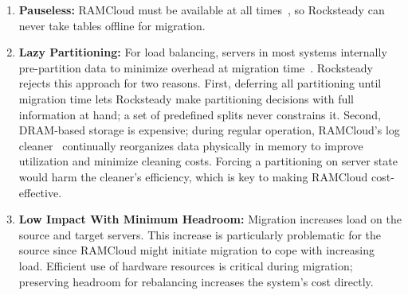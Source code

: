 \begin{enumerate}
\item {\bf Pauseless:}
RAMCloud must be available at all times~\cite{ramcloud-recovery}, so
Rocksteady can never take tables offline for migration.

\item {\bf Lazy Partitioning:}
For load balancing, servers in most systems
internally pre-partition data
to minimize overhead at migration time~\cite{dynamo,farm-2014}.
Rocksteady rejects this approach for two reasons. First, deferring all
partitioning until migration time lets Rocksteady make partitioning
decisions with full information at hand; a set
of predefined splits never constrains it. Second, DRAM-based storage is
expensive; during
regular operation, RAMCloud's log cleaner~\cite{ramcloud-lsm}
continually
reorganizes data physically in memory to improve utilization and
minimize cleaning costs. Forcing a partitioning on server state
would harm the cleaner's efficiency, which is key to making RAMCloud
cost-effective.

\item {\bf Low Impact With Minimum Headroom:}
Migration increases load on the source and target servers. This increase
is particularly
problematic for the source since RAMCloud might initiate migration to cope with
increasing load. Efficient use of hardware resources is critical during
migration; preserving headroom for rebalancing increases the
system's cost directly.

\end{enumerate}


